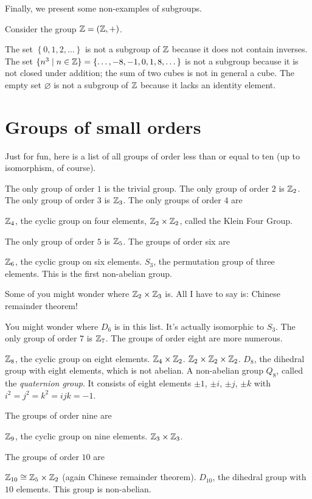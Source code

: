 Finally, we present some non-examples of subgroups.
\begin{example}
	Consider the group $\mathbb Z = (\mathbb Z, +)$.
	\begin{enumerate}[(a)]
		\ii The set $\left\{ 0,1,2,\dots \right\}$ is
		not a subgroup of $\mathbb Z$ because it does not contain inverses.
		\ii The set $\{ n^3 \mid n \in \mathbb Z \}
		= \{ \dots, -8, -1, 0, 1, 8, \dots \}$ is not a subgroup
		because it is not closed under addition;
		the sum of two cubes is not in general a cube.
		\ii The empty set $\varnothing$ is not a subgroup
		of $\mathbb Z$ because it lacks an identity element.
	\end{enumerate}
\end{example}

\section{Groups of small orders}
Just for fun, here is a list of all groups of order less than or equal to ten
(up to isomorphism, of course).
\begin{enumerate}
	\ii The only group of order $1$ is the trivial group.
	\ii The only group of order $2$ is $\mathbb Z_{2}$.
	\ii The only group of order $3$ is $\mathbb Z_{3}$.
	\ii The only groups of order $4$ are
	\begin{itemize}
		\ii $\mathbb Z_{4}$, the cyclic group on four elements,
		\ii $\mathbb Z_{2} \times \mathbb Z_{2}$, called the Klein Four Group.
	\end{itemize}
	\ii The only group of order $5$ is $\mathbb Z_{5}$.
	\ii The groups of order six are
	\begin{itemize}
		\ii $\mathbb Z_{6}$, the cyclic group on six elements.
		\ii $S_3$, the permutation group of three elements.
		This is the first non-abelian group.
	\end{itemize}
	Some of you might wonder where $\mathbb Z_{2} \times \mathbb Z_{3}$ is.
	All I have to say is: Chinese remainder theorem!

	You might wonder where $D_6$ is in this list.
	It's actually isomorphic to $S_3$.
	\ii The only group of order $7$ is $\mathbb Z_{7}$.
	\ii The groups of order eight are more numerous.
	\begin{itemize}
		\ii $\mathbb Z_{8}$, the cyclic group on eight elements.
		\ii $\mathbb Z_{4} \times \mathbb Z_{2}$.
		\ii $\mathbb Z_{2} \times \mathbb Z_{2} \times \mathbb Z_{2}$.
		\ii $D_8$, the dihedral group with eight elements, which is not abelian.
		\ii A non-abelian group $Q_8$, called the \emph{quaternion group}.
		It consists of eight elements $\pm 1$, $\pm i$, $\pm j$, $\pm k$
		with $i^2=j^2=k^2=ijk=-1$.
	\end{itemize}
	\ii The groups of order nine are
	\begin{itemize}
		\ii $\mathbb Z_{9}$, the cyclic group on nine elements.
		\ii $\mathbb Z_{3} \times \mathbb Z_{3}$.
	\end{itemize}
	\ii The groups of order $10$ are
	\begin{itemize}
		\ii $\mathbb Z_{10} \cong \mathbb Z_{5} \times \mathbb Z_{2}$ (again Chinese remainder theorem).
		\ii $D_{10}$, the dihedral group with $10$ elements.
		This group is non-abelian.
	\end{itemize}
\end{enumerate}

